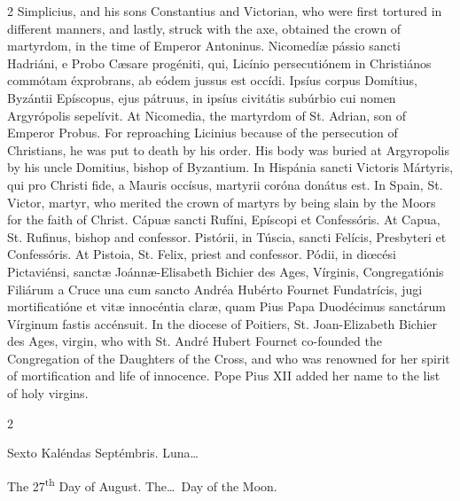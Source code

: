 \begin{paracol}{2}
 Simplicius, and his sons Constantius and Victorian, who were first tortured 
 in different manners, and lastly, struck with the axe, obtained the crown of 
 martyrdom, in the time of Emperor Antoninus.
\switchcolumn*
{}
Nicomedíæ pássio sancti 
 Hadriáni, e Probo Cæsare progéniti, qui, Licínio persecutiónem in 
 Christiános commótam éxprobrans, ab eódem jussus est occídi. Ipsíus 
 corpus Domítius, Byzántii Epíscopus, ejus pátruus, in ipsíus civitátis 
 subúrbio cui nomen Argyrópolis sepelívit.
\switchcolumn
{}
At Nicomedia, the martyrdom of St. 
 Adrian, son of Emperor Probus. For reproaching Licinius because of the 
 persecution of Christians, he was put to death by his order. His body 
 was buried at Argyropolis by his uncle Domitius, bishop of Byzantium.
\switchcolumn*
{}
In Hispánia sancti 
 Victoris Mártyris, qui pro Christi fide, a Mauris occísus, martyrii coróna 
 donátus est.
\switchcolumn
{}
In Spain, St. Victor, martyr, who 
 merited the crown of martyrs by being slain by the Moors for the faith of 
 Christ.
\switchcolumn*
{}
Cápuæ sancti Rufíni, 
 Epíscopi et Confessóris.
\switchcolumn
{}
At Capua, St. Rufinus, bishop and 
 confessor.
\switchcolumn*
{}
Pistórii, in Túscia, 
 sancti Felícis, Presbyteri et Confessóris.
\switchcolumn
{}
At Pistoia, St. Felix, priest and 
 confessor.
\switchcolumn*
{}
Pódii, in diœcési 
 Pictaviénsi, sanctæ Joánnæ-Elisabeth Bichier des Ages, Vírginis, 
 Congregatiónis Filiárum a Cruce una cum sancto Andréa Hubérto Fournet 
 Fundatrícis, jugi mortificatióne et vitæ innocéntia claræ, quam Pius Papa 
 Duodécimus sanctárum Vírginum fastis accénsuit.
\switchcolumn
{}
In the diocese of Poitiers, St. 
 Joan-Elizabeth Bichier des Ages, virgin, who with St. André Hubert Fournet 
 co-founded the Congregation of the Daughters of the Cross, and who was 
 renowned for her spirit of mortification and life of innocence. Pope 
 Pius XII added her name to the list of holy virgins.
\switchcolumn*
{}
\end{paracol}


\begin{paracol}{2}
\begin{center}{\color{gregoriocolor} Sexto Kaléndas Septémbris. 
 Luna\dots\ }\end{center}
\switchcolumn
{}
\begin{center}{\color{gregoriocolor} The 
 27\textsuperscript{th} Day of 
 August. The\dots\ Day of the Moon.}\end{center}
\end{paracol}

